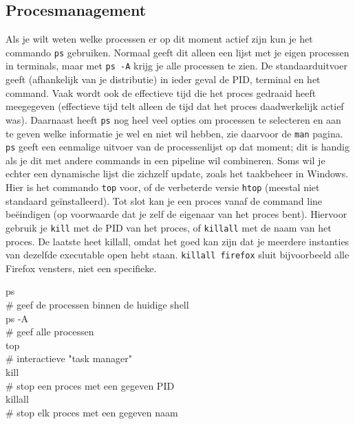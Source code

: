 \subsection{Procesmanagement}\label{procesmanagement}

Als je wilt weten welke processen er op dit moment actief zijn kun je het commando \texttt{ps} gebruiken. Normaal geeft dit alleen een lijst met je eigen processen in terminals, maar met \texttt{ps\ -A} krijg je alle processen te zien. De standaarduitvoer geeft (afhankelijk van je distributie) in ieder geval de PID, terminal en het command. Vaak wordt ook de effectieve tijd die het proces gedraaid heeft meegegeven (effectieve tijd telt alleen de tijd dat het proces daadwerkelijk actief was). Daarnaast heeft \texttt{ps} nog heel veel opties om processen te selecteren en aan te geven welke informatie je wel en niet wil hebben, zie daarvoor de \texttt{man} pagina. \texttt{ps} geeft een eenmalige uitvoer van de processenlijst op dat moment; dit is handig als je dit met andere commands in een pipeline wil combineren. Soms wil je echter een dynamische lijst die zichzelf update, zoals het taakbeheer in Windows. Hier is het commando \texttt{top} voor, of de verbeterde versie \texttt{htop} (meestal niet standaard geïnstalleerd). Tot slot kan je een proces vanaf de command line beëindigen (op voorwaarde dat je zelf de eigenaar van het proces bent). Hiervoor gebruik je \texttt{kill} met de PID van het proces, of \texttt{killall} met de naam van het proces. De laatste heet killall, omdat het goed kan zijn dat je meerdere instanties van dezelfde executable open hebt staan. \texttt{killall\ firefox} sluit bijvoorbeeld alle Firefox vensters, niet een specifieke.

\begin{bash}
\userprompt[~] ps\\
\# geef de processen binnen de huidige shell\\

\userprompt[~] ps -A\\
\# geef alle processen\\

\userprompt[~] top\\
\# interactieve "task manager"\\

\userprompt[~] kill\\
\# stop een proces met een gegeven PID\\

\userprompt[~] killall\\
\# stop elk proces met een gegeven naam\\
\end{bash}

